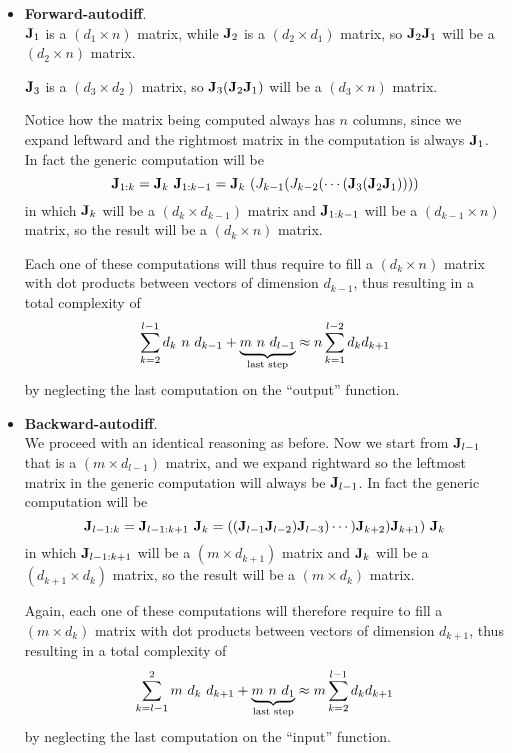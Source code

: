 \begin{itemize}
    \item \textbf{Forward-autodiff}.\\
    $\vb{J}_1$ is a $(d_1 \times n)$ matrix, while $\vb{J}_2$ is a $(d_2 \times d_1)$ matrix, so $\vb{J}_2 \vb{J}_1$ will be a $(d_2 \times n)$ matrix. 
    
    $\vb{J}_3$ is a $(d_3 \times d_2)$ matrix, so $\vb{J}_3 (\vb{J}_2 \vb{J}_1)$ will be a $(d_3 \times n)$ matrix.

    Notice how the matrix being computed always has $n$ columns, since we expand leftward and the rightmost matrix in the computation is always $\vb{J}_1$. In fact the generic computation will be
    \begin{equation}
        \vb{J}_{1:k} = \vb{J}_{k} ~ \vb{J}_{1:k-1} = \vb{J}_k ~ (J_{k-1} (J_{k-2}(\cdots (\vb{J}_3 (\vb{J}_2 \vb{J}_1))))
    \end{equation}
    in which $\vb{J}_{k}$ will be a $(d_k \times d_{k-1})$ matrix and $\vb{J}_{1:k-1}$ will be a $(d_{k-1} \times n)$ matrix, so the result will be a $(d_k \times n)$ matrix. 
    
    Each one of these computations will thus require to fill a $(d_{k} \times n)$ matrix with dot products between vectors of dimension $d_{k-1}$, thus resulting in a total complexity of
    \begin{equation}
        \sum_{k=2}^{l-1} d_k ~ n ~ d_{k-1} + \underbrace{m ~ n ~ d_{l-1}}_{\mathclap{\text{last step}}} \approx  n\sum_{k=1}^{l-2} d_k d_{k+1}
    \end{equation}
    by neglecting the last computation on the ``output'' function.

    \item \textbf{Backward-autodiff}.\\
    We proceed with an identical reasoning as before. Now we start from $\vb{J}_{l-1}$ that is a $(m \times d_{l-1})$ matrix, and we expand rightward so the leftmost matrix in the generic computation will always be $\vb{J}_{l-1}$. In fact the generic computation will be
    \begin{equation}
        \vb{J}_{l-1:k} = \vb{J}_{l-1:k+1} ~ \vb{J}_{k} = ((\vb{J}_{l-1} \vb{J}_{l-2}) \vb{J}_{l-3}) \cdots ) \vb{J}_{k+2} ) \vb{J}_{k+1}) ~ \vb{J}_{k}
    \end{equation}
    in which $\vb{J}_{l-1:k+1}$ will be a $(m \times d_{k+1})$ matrix and $\vb{J}_{k}$ will be a $(d_{k+1} \times d_k)$ matrix, so the result will be a $(m \times d_k)$ matrix.

    Again, each one of these computations will therefore require to fill a $(m \times d_k)$ matrix with dot products between vectors of dimension $d_{k+1}$, thus resulting in a total complexity of
    \begin{equation}
        \sum_{k=l-1}^{2} m ~ d_k ~ d_{k+1} + \underbrace{m ~ n ~ d_{1}}_{\mathclap{\text{last step}}} \approx m \sum_{k = 2}^{l-1} d_{k} d_{k+1}
    \end{equation}
    by neglecting the last computation on the ``input'' function.
\end{itemize}


